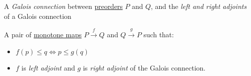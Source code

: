 
A \emph{Galois connection} between \href{doc/1 math/Seven Sketches in Compositionality/Chapter 1: Generative Effects/3 Preorders/1 Preorder}{preorders} $P$ and $Q$, and the \emph{left and right adjoints} of a Galois connection

A pair of \href{doc/1 math/Seven Sketches in Compositionality/Chapter 1: Generative Effects/4 Monotone maps/1 Monotone map}{monotone maps} $P \xrightarrow{f} Q$ and $Q \xrightarrow{g} P$ such that:
\begin{itemize}
  \item $f(p) \leq q \iff p \leq g(q)$
  \item $f$ is \emph{left adjoint} and $g$ is \emph{right adjoint} of the Galois connection.
\end{itemize}
